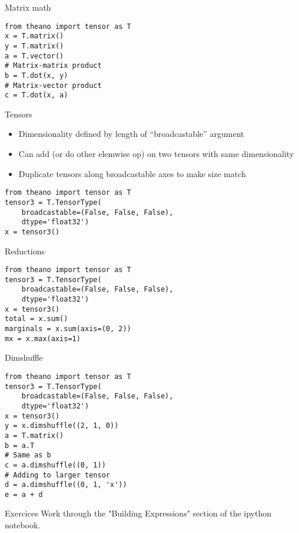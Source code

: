 \documentclass[utf8x,hyperref={pdfpagelabels=false}]{beamer}
\begin{document}
\begin{frame}[fragile]{Matrix math}
\begin{lstlisting}
from theano import tensor as T
x = T.matrix()
y = T.matrix()
a = T.vector()
# Matrix-matrix product
b = T.dot(x, y)
# Matrix-vector product
c = T.dot(x, a)
\end{lstlisting}
\end{frame}

\begin{frame}[fragile]{Tensors}
   \begin{itemize}
    \item Dimensionality defined by length of ``broadcastable'' argument
    \item Can add (or do other elemwise op) on two
      tensors with same dimensionality
    \item Duplicate tensors along broadcastable axes to
      make size match
  \end{itemize}
\begin{lstlisting}
from theano import tensor as T
tensor3 = T.TensorType(
    broadcastable=(False, False, False),
    dtype='float32')
x = tensor3()
\end{lstlisting}
\end{frame}

\begin{frame}[fragile]{Reductions}
\begin{lstlisting}
from theano import tensor as T
tensor3 = T.TensorType(
    broadcastable=(False, False, False),
    dtype='float32')
x = tensor3()
total = x.sum()
marginals = x.sum(axis=(0, 2))
mx = x.max(axis=1)
\end{lstlisting}
\end{frame}

\begin{frame}[fragile]{Dimshuffle}
\begin{lstlisting}
from theano import tensor as T
tensor3 = T.TensorType(
    broadcastable=(False, False, False),
    dtype='float32')
x = tensor3()
y = x.dimshuffle((2, 1, 0))
a = T.matrix()
b = a.T
# Same as b
c = a.dimshuffle((0, 1))
# Adding to larger tensor
d = a.dimshuffle((0, 1, 'x'))
e = a + d
\end{lstlisting}
\end{frame}

\begin{frame}{Exercices}
Work through the "Building Expressions" section of the ipython notebook.
\end{frame}
\end{document}
